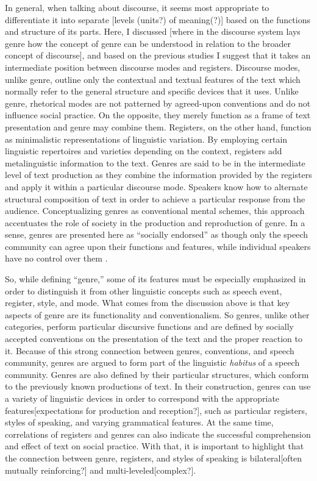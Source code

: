 \documentclass[12pt]{turabian-researchpaper}
\begin{document}
In general, when talking about discourse, it seems most appropriate to differentiate it into separate [levels (units?) of meaning(?)] based on the functions and structure of its parts. Here, I discussed [where in the discourse system lays genre how the concept of genre can be understood in relation to the broader concept of discourse], and based on the previous studies I suggest that it takes an intermediate position between discourse modes and registers. Discourse modes, unlike genre, outline only the contextual and textual features of the text which normally refer to the general structure and specific devices that it uses. Unlike genre, rhetorical modes are not patterned by agreed-upon conventions and do not influence social practice. On the opposite, they merely function as a frame of text presentation and genre may combine them. Registers, on the other hand, function as minimalistic representations of linguistic variation. By employing certain linguistic repertoires and varieties depending on the context, registers add metalinguistic information to the text. Genres are said to be in the intermediate level of text production as they combine the information provided by the registers and apply it within a particular discourse mode. Speakers know how to alternate structural composition of text in order to achieve a particular response from the audience. Conceptualizing genres as conventional mental schemes, this approach accentuates the role of society in the production and reproduction of genre. In a sense, genres are presented here as ``socially endorsed'' as though only the speech community can agree upon their functions and features, while individual speakers have no control over them \parencite[p. 60]{bax2011}.
  
So, while defining ``genre,'' some of its features must be especially emphasized in order to distinguish it from other linguistic concepts such as speech event, register, style, and mode. What comes from the discussion above is that key aspects of genre are its functionality and conventionalism. So genres, unlike other categories, perform particular discursive functions and are defined by socially accepted conventions on the presentation of the text and the proper reaction to it. Because of this strong connection between genres, conventions, and speech community, genres are argued to form part of the linguistic \textit{habitus} of a speech community. Genres are also defined by their particular structures, which conform to the previously known productions of text. In their construction, genres can use a variety of linguistic devices in order to correspond with the appropriate features[expectations for production and reception?], such as particular registers, styles of speaking, and varying grammatical features. At the same time, correlations of registers and genres can also indicate the successful comprehension and effect of text on  social practice. With that, it is important to highlight that the connection between genre, registers, and styles of speaking is bilateral[often mutually reinforcing?] and multi-leveled[complex?]. 
\end{document}
